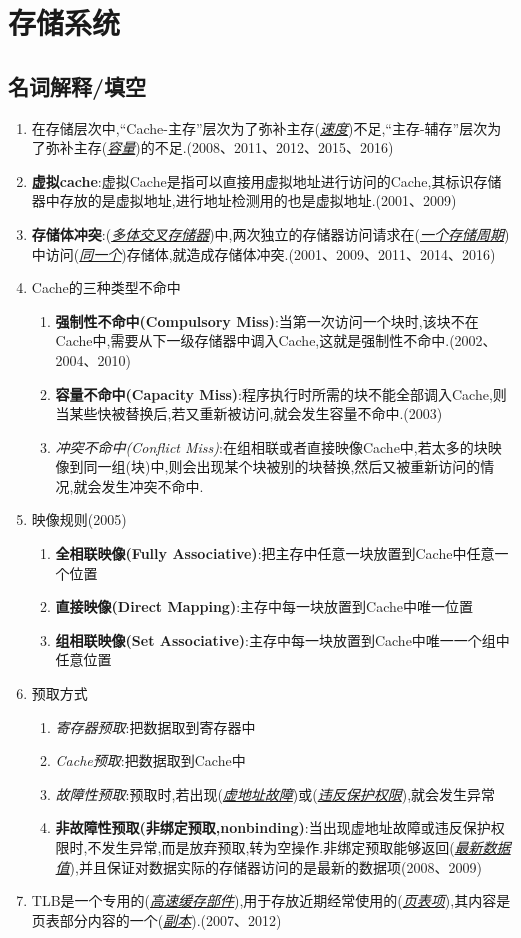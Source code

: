 \documentclass[a4paper]{ctexart}
\newcommand{\blank}[1]{(\emph{\underline{#1}})}
\begin{document}
\newpage
\section{存储系统}
\subsection{名词解释/填空}
\begin{enumerate}
  \item 在存储层次中,“Cache-主存”层次为了弥补主存\blank{速度}不足,“主存-辅存”层次为了弥补主存\blank{容量}的不足.(2008、2011、2012、2015、2016)
  \item \textbf{虚拟cache}:虚拟Cache是指可以直接用虚拟地址进行访问的Cache,其标识存储器中存放的是虚拟地址,进行地址检测用的也是虚拟地址.(2001、2009)
  \item \textbf{存储体冲突}:\blank{多体交叉存储器}中,两次独立的存储器访问请求在\blank{一个存储周期}中访问\blank{同一个}存储体,就造成存储体冲突.(2001、2009、2011、2014、2016)
  \item Cache的三种类型不命中
  \begin{enumerate}
    \item \textbf{强制性不命中(Compulsory Miss)}:当第一次访问一个块时,该块不在Cache中,需要从下一级存储器中调入Cache,这就是强制性不命中.(2002、2004、2010)
    \item \textbf{容量不命中(Capacity Miss)}:程序执行时所需的块不能全部调入Cache,则当某些快被替换后,若又重新被访问,就会发生容量不命中.(2003)
    \item \emph{冲突不命中(Conflict Miss)}:在组相联或者直接映像Cache中,若太多的块映像到同一组(块)中,则会出现某个块被别的块替换,然后又被重新访问的情况,就会发生冲突不命中.
  \end{enumerate}
  \item 映像规则(2005)
  \begin{enumerate}
    \item \textbf{全相联映像(Fully Associative)}:把主存中任意一块放置到Cache中任意一个位置
    \item \textbf{直接映像(Direct Mapping)}:主存中每一块放置到Cache中唯一位置
    \item \textbf{组相联映像(Set Associative)}:主存中每一块放置到Cache中唯一一个组中任意位置
  \end{enumerate}
  \item 预取方式
  \begin{enumerate}
    \item \emph{寄存器预取}:把数据取到寄存器中
    \item \emph{Cache预取}:把数据取到Cache中
    \item \emph{故障性预取}:预取时,若出现\blank{虚地址故障}或\blank{违反保护权限},就会发生异常
    \item \textbf{非故障性预取(非绑定预取,nonbinding)}:当出现虚地址故障或违反保护权限时,不发生异常,而是放弃预取,转为空操作.非绑定预取能够返回\blank{最新数据值},并且保证对数据实际的存储器访问的是最新的数据项(2008、2009)
  \end{enumerate}
  \item TLB是一个专用的(\emph{\underline{高速缓存部件}}),用于存放近期经常使用的(\emph{\underline{页表项}}),其内容是页表部分内容的一个(\emph{\underline{副本}}).(2007、2012)
\end{enumerate}
\end{document}
